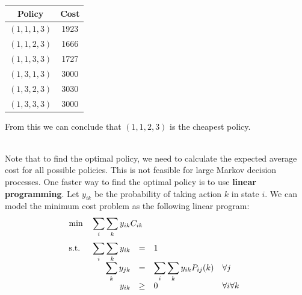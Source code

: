 \documentclass[12pt]{article}
\begin{document}
\begin{table}[h]
    \centering
    \begin{tabular}{c|c}
    Policy & Cost \\ \hline
    $(1, 1, 1, 3)$ & 1923 \\
    $(1, 1, 2, 3)$ & 1666 \\
    $(1, 1, 3, 3)$ & 1727 \\
    $(1, 3, 1, 3)$ & 3000 \\
    $(1, 3, 2, 3)$ & 3030 \\
    $(1, 3, 3, 3)$ & 3000
    \end{tabular}
\end{table}

\noindent
From this we can conclude that $(1, 1, 2, 3)$ is the cheapest policy.

\noindent
\\
Note that to find the optimal policy, we need to calculate the expected average cost for all possible policies.
This is not feasible for large Markov decision processes.
One faster way to find the optimal policy is to use \textbf{linear programming}.
Let $y_{ik}$ be the probability of taking action $k$ in state $i$.
We can model the minimum cost problem as the following linear program:
\begin{align*}
    &\mathrm{min} \quad \sum_{i}\sum_{k} y_{ik} C_{ik} \\[2pt]
    &\mathrm{s.t.} \quad 
    \begin{array}[t]{r c l l}
        \displaystyle\sum_{i}\displaystyle\sum_{k} y_{ik} & = & 1 & \\
        \displaystyle\sum_{k} y_{jk} & = & \displaystyle\sum_{i}\displaystyle\sum_{k} y_{ik} P_{ij}(k) & \forall j \\
        y_{ik} & \geq & 0 & \forall i \forall k
     \end{array}
\end{align*}
\end{document}
